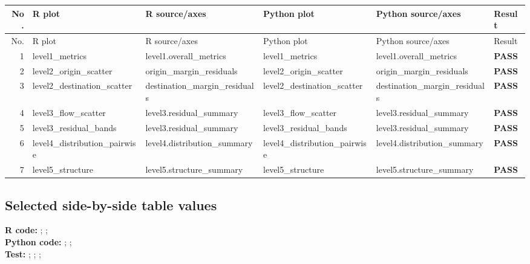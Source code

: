 \documentclass[10pt]{article}
\begin{document}
\footnotesize
\begin{longtable}{@{}r p{}p{}p{}p{}l@{}}
\toprule
No. & R plot & R source/axes & Python plot & Python source/axes & Result \\
\midrule
\endfirsthead
\toprule
No. & R plot & R source/axes & Python plot & Python source/axes & Result \\
\midrule
\endhead
1 & level1\_\allowbreak{}metrics & level1.overall\_\allowbreak{}metrics & level1\_\allowbreak{}metrics & level1.overall\_\allowbreak{}metrics & \textcolor{passgreen}{\textbf{PASS}} \\
2 & level2\_\allowbreak{}origin\_\allowbreak{}scatter & origin\_\allowbreak{}margin\_\allowbreak{}residuals & level2\_\allowbreak{}origin\_\allowbreak{}scatter & origin\_\allowbreak{}margin\_\allowbreak{}residuals & \textcolor{passgreen}{\textbf{PASS}} \\
3 & level2\_\allowbreak{}destination\_\allowbreak{}scatter & destination\_\allowbreak{}margin\_\allowbreak{}residuals & level2\_\allowbreak{}destination\_\allowbreak{}scatter & destination\_\allowbreak{}margin\_\allowbreak{}residuals & \textcolor{passgreen}{\textbf{PASS}} \\
4 & level3\_\allowbreak{}flow\_\allowbreak{}scatter & level3.residual\_\allowbreak{}summary & level3\_\allowbreak{}flow\_\allowbreak{}scatter & level3.residual\_\allowbreak{}summary & \textcolor{passgreen}{\textbf{PASS}} \\
5 & level3\_\allowbreak{}residual\_\allowbreak{}bands & level3.residual\_\allowbreak{}summary & level3\_\allowbreak{}residual\_\allowbreak{}bands & level3.residual\_\allowbreak{}summary & \textcolor{passgreen}{\textbf{PASS}} \\
6 & level4\_\allowbreak{}distribution\_\allowbreak{}pairwise & level4.distribution\_\allowbreak{}summary & level4\_\allowbreak{}distribution\_\allowbreak{}pairwise & level4.distribution\_\allowbreak{}summary & \textcolor{passgreen}{\textbf{PASS}} \\
7 & level5\_\allowbreak{}structure & level5.structure\_\allowbreak{}summary & level5\_\allowbreak{}structure & level5.structure\_\allowbreak{}summary & \textcolor{passgreen}{\textbf{PASS}} \\
\bottomrule
\end{longtable}
\normalsize

\subsection{Selected side-by-side table values}
{\footnotesize \textbf{R code:} ; ; \\ \textbf{Python code:} ; ; \\ \textbf{Test:} ; ; ; \par}
\end{document}
